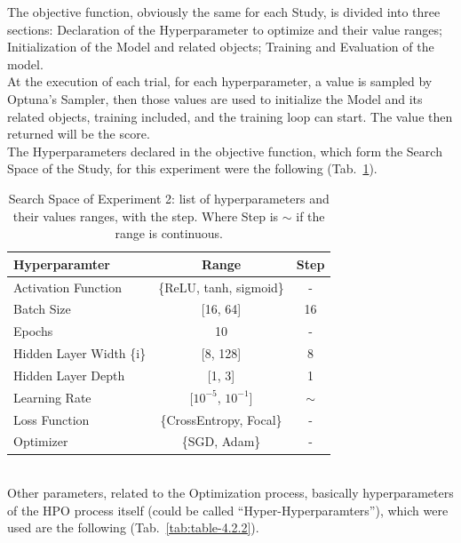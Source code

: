 The objective function, obviously the same for each Study, is divided into three sections: Declaration of the Hyperparameter to optimize and their value ranges; Initialization of the Model and related objects; Training and Evaluation of the model.
\\[0.3cm]At the execution of each trial, for each hyperparameter, a value is sampled by Optuna's Sampler, then those values are used to initialize the Model and its related objects, training included, and the training loop can start. The value then returned will be the score.
% 
\\[0.3cm]The Hyperparameters declared in the objective function, which form the Search Space of the Study, for this experiment were the following (Tab.~\ref{tab:table-4.2.1}).
\begin{table}[ht!]
	\center
	\setlength{\tabcolsep}{0.5cm}
	\caption[Search Space of Experiment 2]{Search Space of Experiment 2: list of hyperparameters and their values ranges, with the step. Where Step is $\sim$ if the range is continuous.}
	\begin{tabular}{@{}lcc@{}}
		\toprule
		\textbf{Hyperparamter}   & \textbf{Range}             & \textbf{Step} \\ \midrule
		Activation Function      & \{ReLU, tanh, sigmoid\}    & -             \\[0.1cm]
		Batch Size               & {[}16, 64{]}               & 16            \\[0.1cm]
		Epochs                   & 10                         & -             \\[0.1cm]
		Hidden Layer Width \{i\} & {[}8, 128{]}               & 8             \\[0.1cm]
		Hidden Layer Depth       & {[}1, 3{]}                 & 1             \\[0.1cm]
		Learning Rate            & {[}$10^{-5}$, $10^{-1}${]} & $\sim$        \\[0.1cm]
		Loss Function            & \{CrossEntropy, Focal\}    & -             \\[0.1cm]
		Optimizer                & \{SGD, Adam\}              & -             \\ \bottomrule
	\end{tabular}
	\label{tab:table-4.2.1}
\end{table}
% 
\\[0.3cm]Other parameters, related to the Optimization process, basically hyperparameters of the HPO process itself (could be called “Hyper-Hyperparamters”), which were used are the following (Tab.~\ref{tab:table-4.2.2}).

